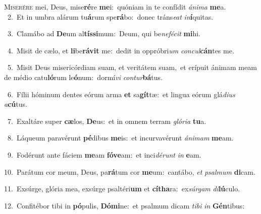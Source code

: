 \lettrine{\initial\textcolor{\initialcolor}{M}}{iserére} mei, Deus, mise\-\textbf{ré}\-re \textbf{me}\-i:~\star quóniam in te confídit \textit{á}\-\textit{ni}\textit{ma} \textbf{me}\-a.\\
{\numbfont\textcolor{\numbcolor}{~2.}}~Et in umbra alárum tu\-\textbf{á}\-rum spe\-\textbf{rá}\-bo:~\star donec tráns\-\textit{e}\-\textit{at} \textit{in}\-\textbf{í}quitas.\par
{\numbfont\textcolor{\numbcolor}{~3.}}~Clamábo ad \textbf{De}\-um al\-\textbf{tís}\-\textbf{si}mum:~\star Deum, qui be\-\textit{ne}\-\textit{fé}\textit{cit} \textbf{mi}\-hi.\par
{\numbfont\textcolor{\numbcolor}{~4.}}~Misit de cælo, et \textbf{li}\-be\-\textbf{rá}\-\textbf{vit} me:~\star dedit in oppróbri\textit{um} \textit{con}\-\textit{cul}\textbf{cán}tes me.\par
{\numbfont\textcolor{\numbcolor}{~5.}}~Misit Deus misericórdiam suam, et veritátem suam,~\dagger et erípuit ánimam meam de médio catu\-\textbf{ló}\-rum le\-\textbf{ó}\-num:~\star dormí\textit{vi} \textit{con}\-\textit{tur}\textbf{bá}tus.\par
{\numbfont\textcolor{\numbcolor}{~6.}}~Fílii hóminum dentes eórum arma \textbf{et} sa\-\textbf{gít}\-tæ:~\star et lingua eórum glá\-\textit{di}\-\textit{us} \textit{a}\-\textbf{cú}tus.\par
{\numbfont\textcolor{\numbcolor}{~7.}}~Exaltáre super \textbf{cæ}\-los, \textbf{De}\-us:~\star et in omnem terram \textit{gló}\-\textit{ri}\textit{a} \textbf{tu}\-a.\par
{\numbfont\textcolor{\numbcolor}{~8.}}~Láqueum paravérunt \textbf{pé}\-dibus \textbf{me}\-is:~\star et incurvavérunt \textit{á}\-\textit{ni}\textit{mam} \textbf{me}\-am.\par
{\numbfont\textcolor{\numbcolor}{~9.}}~Fodérunt ante fáciem \textbf{me}\-am \textbf{fó}\-\textbf{ve}am:~\star et inci\-\textit{dé}\-\textit{runt} \textit{in} \textbf{e}\-am.\par
{\numbfont\textcolor{\numbcolor}{10.}}~Parátum cor meum, Deus, pa\-\textbf{rá}\-tum cor \textbf{me}\-um:~\star cantábo, \textit{et} \textit{psal}\-\textit{mum} \textbf{di}\-cam.\par
{\numbfont\textcolor{\numbcolor}{11.}}~Exsúrge, glória mea, exsúrge psaltéri\textbf{um} et \textbf{cí}\-\textbf{tha}ra:~\star ex\-\textit{súr}\-\textit{gam} \textit{di}\-\textbf{lú}culo.\par
{\numbfont\textcolor{\numbcolor}{12.}}~Confitébor tibi in \textbf{pó}\-pulis, \textbf{Dó}\-\textbf{mi}ne:~\star et psalmum dicam \textit{ti}\-\textit{bi} \textit{in} \textbf{Gén}\-tibus:\par
